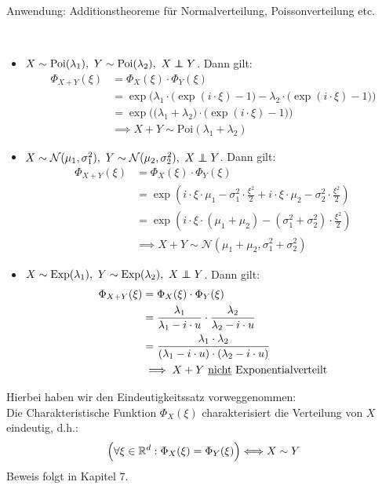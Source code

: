 Anwendung: Additionstheoreme für Normalverteilung, Poissonverteilung etc.

\begin{beisp}\
\begin{itemize}
\item $X\sim\text{Poi}(\lambda_1),~Y\sim\text{Poi}(\lambda_2),~X\unab Y$. Dann gilt:
\begin{align*}
\Phi_{X+Y}(\xi)
&=\Phi_X(\xi)\cdot\Phi_Y(\xi)\\
&=\exp\Big(\lambda_1\cdot\big(\exp(i\cdot\xi)-1\big)-\lambda_2\cdot\big(\exp(i\cdot\xi)-1\big)\Big)\\
&=\exp\Big(\big(\lambda_1+\lambda_2\big)\cdot\big(\exp(i\cdot\xi)-1\big)\Big)\\
&\implies X+Y\sim\text{Poi}(\lambda_1+\lambda_2)
\end{align*}
\item $X\sim\mathcal{N}(\mu_1,\sigma_1^2),~Y\sim\mathcal{N}(\mu_2,\sigma_2^2),~X\unab Y$. Dann gilt:
\begin{align*}
\Phi_{X+Y}(\xi)
&=\Phi_X(\xi)\cdot\Phi_Y(\xi)\\
&=\exp\left(i\cdot\xi\cdot\mu_1-\sigma_1^2\cdot\frac{\xi^2}{2}+i\cdot\xi\cdot\mu_2-\sigma_2^2\cdot\frac{\xi^2}{2}\right)\\
&=\exp\left(i\cdot\xi\cdot(\mu_1+\mu_2)-(\sigma_1^2+\sigma_2^2)\cdot\frac{\xi^2}{2}\right)\\
&\implies
X+Y\sim\mathcal{N}(\mu_1+\mu_2,\sigma_1^2+\sigma_2^2)
\end{align*}
\item $X\sim\text{Exp}(\lambda_1),~Y\sim\text{Exp}(\lambda_2),~X\unab Y$. Dann gilt:
\begin{align*}
\Phi_{X+Y}(\xi)
&=\Phi_X(\xi)\cdot\Phi_Y(\xi) \\
&=\frac{\lambda_1}{\lambda_1-i\cdot u}\cdot\frac{\lambda_2}{\lambda_2-i\cdot u} \\
&=\frac{\lambda_1\cdot\lambda_2}{(\lambda_1-i\cdot u)\cdot(\lambda_2-i\cdot u)}\\
&\implies X+Y\text{ \underline{nicht} Exponentialverteilt}
\end{align*}
\end{itemize}
\end{beisp}

\begin{bemerkung}
Hierbei haben wir den Eindeutigkeitssatz vorweggenommen:\\
Die Charakteristische Funktion $\Phi_X(\xi)$ charakterisiert die Verteilung von $X$ eindeutig, d.h.:
\begin{align*}
\Big(\forall\xi\in\mathbb{R}^d:\Phi_X(\xi)=\Phi_Y(\xi)\Big)\Longleftrightarrow X\sim Y
\end{align*}
Beweis folgt in Kapitel 7.
\end{bemerkung}


